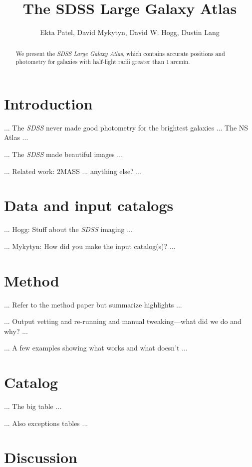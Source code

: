 \documentclass[12pt,preprint,dvipdf]{aastex}
\newcounter{address}
\newcommand{\project}[1]{\textsl{#1}}
\newcommand{\units}[1]{\mathrm{#1}}
\renewcommand{\arcmin}{\units{arcmin}}
\begin{document}
\title{
       The SDSS Large Galaxy Atlas
      }
\author{
        Ekta Patel\altaffilmark{\ref{CCPP}},
        David Mykytyn\altaffilmark{\ref{CCPP}},
        David W. Hogg\altaffilmark{\ref{CCPP},\ref{MPIA},\ref{email}},
        Dustin Lang\altaffilmark{\ref{CMU}}
       }
\setcounter{address}{1}

\begin{abstract}
We present the \project{SDSS Large Galaxy Atlas}, which contains
accurate positions and photometry for galaxies with half-light radii
greater than $1~\arcmin$.
\end{abstract}

\section{Introduction}

... The \project{SDSS} never made good photometry for the brightest galaxies ... The NS Atlas ...

... The \project{SDSS} made beautiful images ...

... Related work:  2MASS ... anything else? ...

\section{Data and input catalogs}

... Hogg: Stuff about the \project{SDSS} imaging ...

... Mykytyn: How did you make the input catalog(s)? ...

\section{Method}

... Refer to the method paper but summarize highlights ...

... Output vetting and re-running and manual tweaking---what did we do and why? ...

... A few examples showing what works and what doesn't ...

\section{Catalog}

... The big table ...

... Also exceptions tables ...

\section{Discussion}
\end{document}
